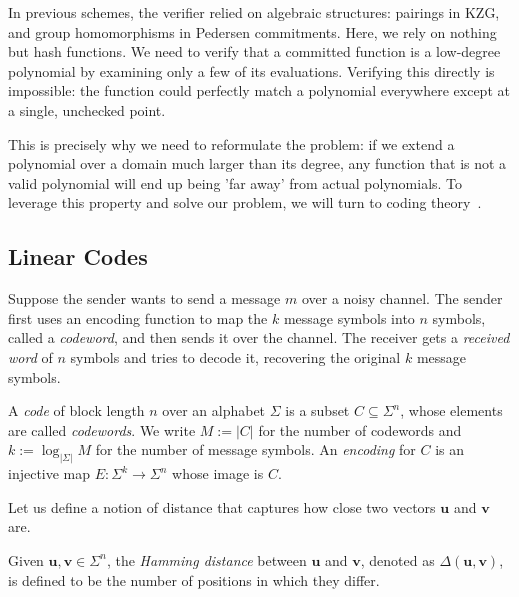 \documentclass[../../book]{subfiles}
\begin{document}
In previous schemes, the verifier relied on algebraic structures: pairings in KZG, and group homomorphisms in Pedersen commitments. Here, we rely on nothing but hash functions. We need to verify that a committed function is a low-degree polynomial by examining only a few of its evaluations. Verifying this directly is impossible: the function could perfectly match a polynomial everywhere except at a single, unchecked point.

This is precisely why we need to reformulate the problem: if we extend a polynomial over a domain much larger than its degree, any function that is not a valid polynomial will end up being 'far away' from actual polynomials. To leverage this property and solve our problem, we will turn to coding theory~\cite{guruswami23}.
\subsection{Linear Codes}
\begin{intuition}
  Suppose the sender wants to send a message $m$ over a noisy channel. The sender first uses an encoding function to map the $k$ message symbols into $n$ symbols, called a \emph{codeword}, and then sends it over the channel. The receiver gets a \emph{received word} of $n$ symbols and tries to decode it, recovering the original $k$ message symbols.
\end{intuition}

\begin{definition}[Code]\label{def:code}
  A \emph{code} of block length $n$ over an alphabet $\Sigma$ is a subset $C \subseteq \Sigma^n$, whose elements are called \emph{codewords}. We write $M := |C|$ for the number of codewords and $k := \log_{|\Sigma|} M$ for the number of message symbols. An \emph{encoding} for $C$ is an injective map $E : \Sigma^k \to \Sigma^n$ whose image is $C$.
\end{definition}

Let us define a notion of distance that captures how close two vectors $\mathbf{u}$ and $\mathbf{v}$ are.
\begin{definition}\label{def:hamming-distance}
  Given $\mathbf{u}, \mathbf{v} \in \Sigma^n$, the \emph{Hamming distance} between $\mathbf{u}$ and $\mathbf{v}$, denoted as $\Delta(\mathbf{u}, \mathbf{v})$, is defined to be the number of positions in which they differ.
\end{definition}
\end{document}
